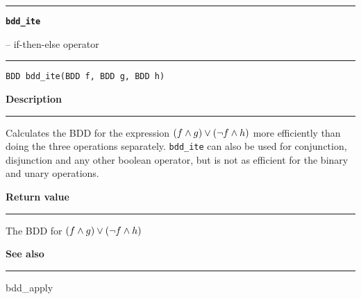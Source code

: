 \begin{minipage}{\textwidth}

\noindent\begin{minipage}{\textwidth}
\rule{\textwidth}{0.5mm}
{\tt\bf bdd\_ite }
\--- if-then-else operator  \hspace{\fill}
\\\rule[1.5ex]{\textwidth}{0.5mm}
\end{minipage}

\noindent\begin{verbatim}
BDD bdd_ite(BDD f, BDD g, BDD h) 
\end{verbatim}

\vspace{\parsep}\noindent
{\bf Description}\\\rule[1.5ex]{\textwidth}{0.2mm}\vspace{-1.5ex}\setlength{\parindent}{1em}
Calculates the BDD for the expression
           $(f \wedge g) \vee (\neg f \wedge h)$ more efficiently than doing
	   the three operations separately. {\tt bdd\_ite} can also be used
	   for conjunction, disjunction and any other boolean operator, but
	   is not as efficient for the binary and unary operations. 

\setlength{\parindent}{0em}\vspace{\parsep}\vspace{\baselineskip}\noindent
{\bf Return value}\\\rule[1.5ex]{\textwidth}{0.2mm}\vspace{-1.5ex}
The BDD for $(f \wedge g) \vee (\neg f \wedge h)$ 

\vspace{\parsep}\vspace{\baselineskip}\noindent
{\bf See also}\\\rule[1.5ex]{\textwidth}{0.2mm}\vspace{-1.5ex}
bdd\_apply 
\end{minipage}
\vspace{8ex}
